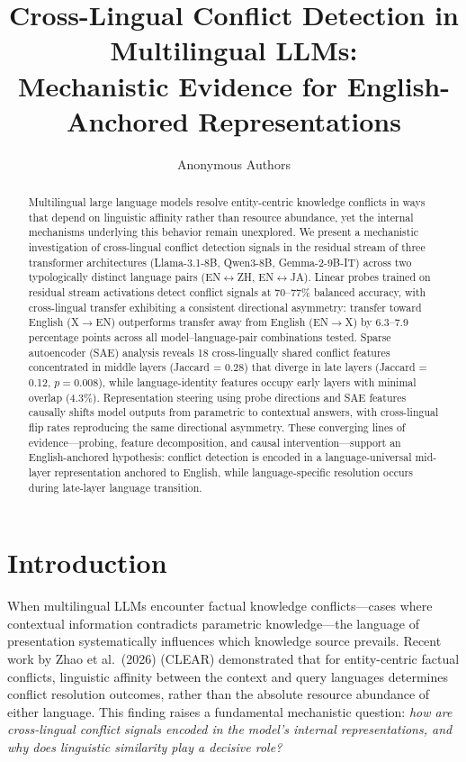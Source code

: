 \documentclass{article}
\title{Cross-Lingual Conflict Detection in Multilingual LLMs:\\
Mechanistic Evidence for English-Anchored Representations}
\author{
Anonymous Authors
}
\date{}
\begin{document}
\maketitle

\begin{abstract}
Multilingual large language models resolve entity-centric knowledge conflicts in ways that depend on linguistic affinity rather than resource abundance, yet the internal mechanisms underlying this behavior remain unexplored. We present a mechanistic investigation of cross-lingual conflict detection signals in the residual stream of three transformer architectures (Llama-3.1-8B, Qwen3-8B, Gemma-2-9B-IT) across two typologically distinct language pairs (EN$\leftrightarrow$ZH, EN$\leftrightarrow$JA). Linear probes trained on residual stream activations detect conflict signals at 70--77\% balanced accuracy, with cross-lingual transfer exhibiting a consistent directional asymmetry: transfer toward English (X$\to$EN) outperforms transfer away from English (EN$\to$X) by 6.3--7.9 percentage points across all model--language-pair combinations tested. Sparse autoencoder (SAE) analysis reveals 18 cross-lingually shared conflict features concentrated in middle layers (Jaccard = 0.28) that diverge in late layers (Jaccard = 0.12, $p = 0.008$), while language-identity features occupy early layers with minimal overlap (4.3\%). Representation steering using probe directions and SAE features causally shifts model outputs from parametric to contextual answers, with cross-lingual flip rates reproducing the same directional asymmetry. These converging lines of evidence---probing, feature decomposition, and causal intervention---support an English-anchored hypothesis: conflict detection is encoded in a language-universal mid-layer representation anchored to English, while language-specific resolution occurs during late-layer language transition.
\end{abstract}

\section{Introduction}

When multilingual LLMs encounter factual knowledge conflicts---cases where contextual information contradicts parametric knowledge---the language of presentation systematically influences which knowledge source prevails. Recent work by Zhao et al.\ (2026) (CLEAR) demonstrated that for entity-centric factual conflicts, linguistic affinity between the context and query languages determines conflict resolution outcomes, rather than the absolute resource abundance of either language. This finding raises a fundamental mechanistic question: \emph{how are cross-lingual conflict signals encoded in the model's internal representations, and why does linguistic similarity play a decisive role?}
\end{document}
